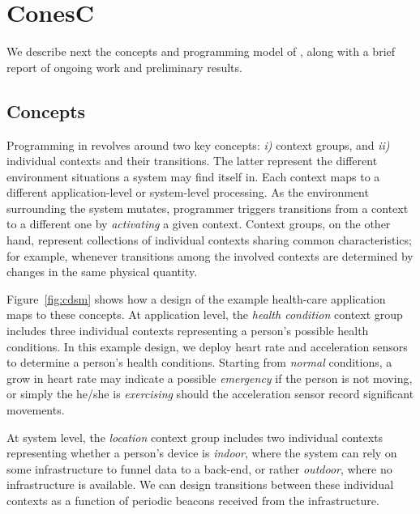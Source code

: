 \section{ConesC}
We describe next the concepts and programming model of \conesc, along
with a brief report of ongoing work and preliminary results.

\subsection{Concepts}

Programming in \conesc revolves around two key concepts: \emph{i)}
context groups, and \emph{ii)} individual contexts and their
transitions. The latter represent the different environment situations
a system may find itself in. Each context maps to a different
application-level or system-level processing. As the environment
surrounding the system mutates, programmer triggers transitions from a
context to a different one by \emph{activating} a given
context. Context groups, on the other hand, represent collections of
individual contexts sharing common characteristics; for example,
whenever transitions among the involved contexts are determined by
changes in the same physical quantity.



Figure~\ref{fig:cdsm} shows how a design of the example health-care
application maps to these concepts. At application level, the
\emph{health condition} context group includes three individual
contexts representing a person's possible health conditions. In this
example design, we deploy heart rate and acceleration sensors to
determine a person's health conditions. Starting from \emph{normal}
conditions, a grow in heart rate may indicate a possible
\emph{emergency} if the person is not moving, or simply the he/she is
\emph{exercising} should the acceleration sensor record significant
movements.

At system level, the \emph{location} context group
includes two individual contexts representing whether a person's
device is \emph{indoor}, where the system can rely on some
infrastructure to funnel data to a back-end, or rather \emph{outdoor},
where no infrastructure is available. We can design transitions
between these individual contexts as a function of periodic beacons
received from the infrastructure.

